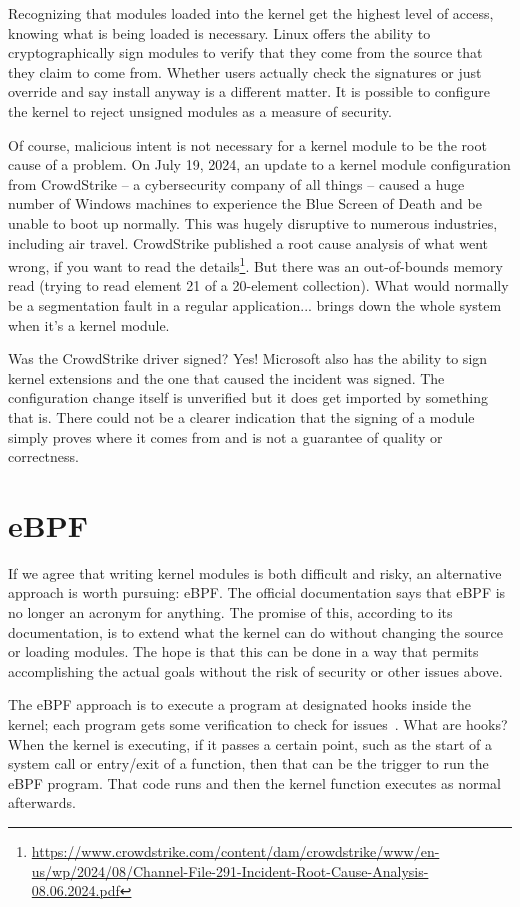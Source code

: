 Recognizing that modules loaded into the kernel get the highest level of access, knowing what is being loaded is necessary. Linux offers the ability to cryptographically sign modules to verify that they come from the source that they claim to come from. Whether users actually check the signatures or just override and say install anyway is a different matter. It is possible to configure the kernel to reject unsigned modules as a measure of security. 

Of course, malicious intent is not necessary for a kernel module to be the root cause of a problem. On July 19, 2024, an update to a kernel module configuration from CrowdStrike -- a cybersecurity company of all things -- caused a huge number of Windows machines to experience the Blue Screen of Death and be unable to boot up normally. This was hugely disruptive to numerous industries, including air travel. CrowdStrike published a root cause analysis of what went wrong, if you want to read the details\footnote{ \url{https://www.crowdstrike.com/content/dam/crowdstrike/www/en-us/wp/2024/08/Channel-File-291-Incident-Root-Cause-Analysis-08.06.2024.pdf} }. But there was an out-of-bounds memory read (trying to read element 21 of a 20-element collection). What would normally be a segmentation fault in a regular application... brings down the whole system when it's a kernel module.

Was the CrowdStrike driver signed? Yes! Microsoft also has the ability to sign kernel extensions and the one that caused the incident was signed. The configuration change itself is unverified but it does get imported by something that is. There could not be a clearer indication that the signing of a module simply proves where it comes from and is not a guarantee of quality or correctness.

\section*{eBPF}
If we agree that writing kernel modules is both difficult and risky, an alternative approach is worth pursuing: eBPF. The official documentation says that eBPF is no longer an acronym for anything. The promise of this, according to its documentation, is to extend what the kernel can do without changing the source or loading modules. The hope is that this can be done in a way that permits accomplishing the actual goals without the risk of security or other issues above.

The eBPF approach is to execute a program at designated hooks inside the kernel; each program gets some verification to check for issues~\cite{ebpf}. What are hooks? When the kernel is executing, if it passes a certain point, such as the start of a system call or entry/exit of a function, then that can be the trigger to run the eBPF program. That code runs and then the kernel function executes as normal afterwards.

